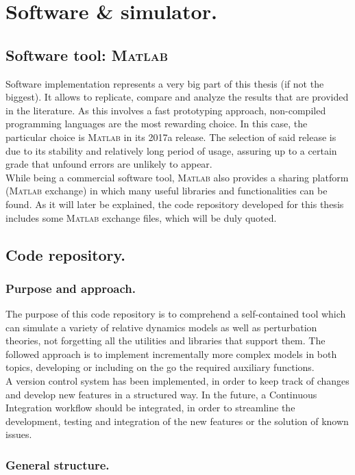 \chapter{Software \& simulator.}
%
\label{app:Software}
%
\section{Software tool: \textsc{Matlab}}
%
\indent Software implementation represents a very big part of this thesis (if not the biggest). It allows to replicate, compare and analyze the results that are provided in the literature. As this involves a fast prototyping approach, non-compiled programming languages are the most rewarding choice. In this case, the particular choice is \textsc{Matlab} in its 2017a release. The selection of said release is due to its stability and relatively long period of usage, assuring up to a certain grade that unfound errors are unlikely to appear. \\
%
\indent While being a commercial software tool, \textsc{Matlab} also provides a sharing platform (\textsc{Matlab} exchange) in which many useful libraries and functionalities can be found. As it will later be explained, the code repository developed for this thesis includes some \textsc{Matlab} exchange files, which will be duly quoted.
%
\section{Code repository.}
%
%
	\subsection{Purpose and approach.}
	\indent The purpose of this code repository is to comprehend a self-contained tool which can simulate a variety of relative dynamics models as well as perturbation theories, not forgetting all the utilities and libraries that support them. The followed approach is to implement incrementally more complex models in both topics, developing or including on the go the required auxiliary functions.\\
	\indent A version control system has been implemented, in order to keep track of changes and develop new features in a structured way. In the future, a Continuous Integration workflow should be integrated, in order to streamline the development, testing and integration of the new features or the solution of known issues.
	\subsection{General structure.}
